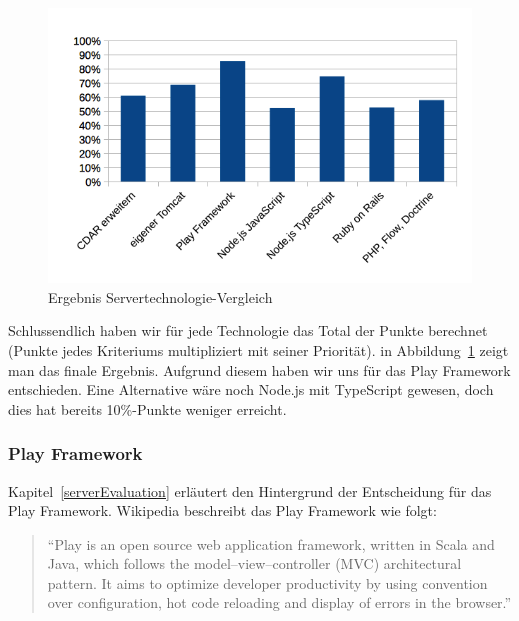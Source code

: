 			\begin{figure}[H]
				\begin{minipage}[b]{\linewidth}
					\includegraphics[width=\textwidth]{media/spreadsheets/ServertechnologieVergleichVergleichDerTechnologienDiagramm.png}
					\centering
					\caption{Ergebnis Servertechnologie-Vergleich}
					\label{fig:ErgebnisServertechnologieVergleich}
				\end{minipage}
			\end{figure}
			
			Schlussendlich haben wir für jede Technologie das Total der Punkte berechnet (Punkte jedes Kriteriums multipliziert mit seiner Priorität). in Abbildung~\ref{fig:ErgebnisServertechnologieVergleich} zeigt man das finale Ergebnis. Aufgrund diesem haben wir uns für das Play Framework entschieden. Eine Alternative wäre noch Node.js mit TypeScript gewesen, doch dies hat bereits 10\%-Punkte weniger erreicht.

		\subsubsection{Play Framework}
			Kapitel~\ref{serverEvaluation} erläutert den Hintergrund der Entscheidung für das Play Framework. 
			Wikipedia beschreibt das Play Framework wie folgt:
			\begin{quote}
				"`Play is an open source web application framework, written in Scala and Java, which follows the model–view–controller (MVC) architectural pattern. It aims to optimize developer productivity by using convention over configuration, hot code reloading and display of errors in the browser."'\cite{_play_2014}
			\end{quote}
			
